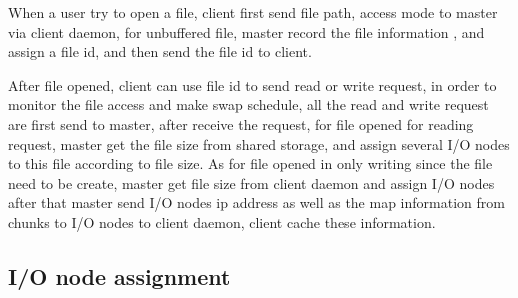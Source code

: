 When a user try to open a file, client first send file path, access mode to master via client daemon, for unbuffered file, master record the file information , and assign a file id,
and then send the file id to client.

After file opened, client can use file id to send read or write request, in order to monitor the file access and make swap schedule, all the read and write request are first send to master,
after receive the request, for file opened for reading request,
master get the file size from shared storage, and assign several I/O nodes to this file according to file size.
As for file opened in only writing since the file need to be create, master get file size from client daemon and assign I/O nodes
after that master send I/O nodes ip address as well as the map information from chunks to I/O nodes to client daemon, client cache these information.

\subsection{I/O node assignment}


